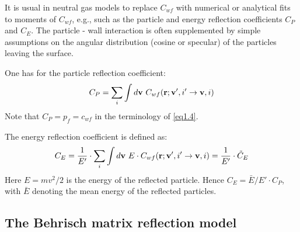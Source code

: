 It is usual in neutral gas models to replace $C_{wf}$ with numerical or
analytical fits to moments of $C_{wf}$, e.g., such as the particle and energy
reflection coefficients $ C_P$ and $ C_E$.
The particle - wall interaction is often supplemented by simple assumptions on
the angular distribution (cosine or specular) of the particles leaving the
surface.

One has  for the particle reflection coefficient:
\begin{equation}
  C_P = \sum_{i}	 \int d \vvv \	C_{wf} ( \vr ; \vvv ', i ' \rightarrow	\vvv ,i)
  \label{eq1.16}
\end{equation}
Note that $ C_P = p_f = c_{wf}$ in the
terminology of \cref{eq1.4}.

The energy reflection coefficient is defined as:
\begin{equation}
  C_E = \frac{1}{E '}	 \cdot \sum_{i}   \int d \vvv \	 E    \cdot C_{wf} (\vr
  ; \vvv ', i ' \rightarrow   \vvv,i) = \frac{1}{E '}     \cdot   {\tilde{C}}_E
  \label{eq1.17}
\end{equation}
Here $E = m v^2 / 2$ is the energy of the
reflected particle.
Hence $C_E = \bar {E}/E' \cdot C_P$, with $\bar {E}$ denoting the mean energy
of the reflected particles.

\subsection{The Behrisch matrix reflection model} \label{sec1.3.1}

